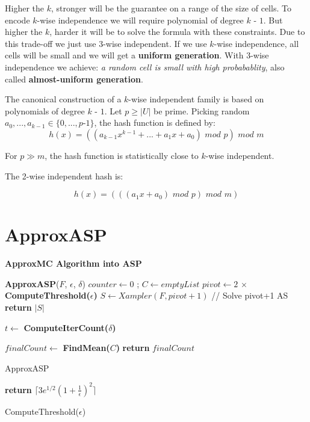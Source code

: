 \documentclass{article}
\begin{document}
Higher the $k$, stronger will be the guarantee on a range of the size of cells. To encode $k$-wise independence we will require polynomial of degree $k$ - $1$. But higher the $k$, harder it will be to solve the formula with these constraints. Due to this trade-off we just use 3-wise independent. If we use $k$-wise independence, all cells will be  small and we will get a \textbf{uniform generation}. With $3$-wise independence we achieve: \emph{a random cell is small with high probabablity}, also called \textbf{almost-uniform generation}.


The canonical construction of a $k$-wise independent family is based on polynomials
of degree $k$ - $1$. Let $p \geq |U|$ be prime. Picking random $a_0,...,a_{k - 1} \in \{0, . . . , p$-$ 1\}$,
the hash function is defined by:
\[ h(x) = ( ( a_{k-1} x^ {k - 1} + ... + a_1 x + a_0) \,\, mod \,\, p) \,\, mod \,\,  m\]


For $p \gg	 m$, the hash function is statistically close to $k$-wise independent.

The 2-wise independent hash is:

\[ h(x) = (((a_1 x + a_0) \,\, mod \,\, p) \,\, mod \,\, m ) \]

\section{ApproxASP} \label{approxasp}
\textbf{ApproxMC Algorithm into ASP}

\begin{algorithm}[h]
	\textbf{ApproxASP}($F$, $\epsilon$, $\delta$) \;
	\SetAlgoLined
	$counter \gets 0$ ; $C \gets emptyList$\;
	$pivot \gets  2 \, \times $ \textbf{ComputeThreshold($\epsilon$)} \;
	$S \gets Xampler(F, pivot + 1)$ // {Solve pivot+1 AS}  \;
	{ %
		\textbf{return} $|S|$
	} %
	{ %
		$t \gets $ \textbf{ComputeIterCount($\delta$)}

	} %
	$finalCount \gets $ \textbf{FindMean($C$)} \;
	\textbf{return} $finalCount$

	\caption{ApproxASP}
\end{algorithm}


\begin{algorithm}
	\textbf{return} $\lceil 3 e^{1/2} (1 + \frac{1}{\epsilon})^2 \rceil$
	\caption{ComputeThreshold($\epsilon$)}
\end{algorithm}
\end{document}
